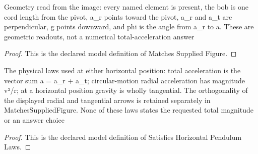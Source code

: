 \begin{definition}
  \label{def:physics:phyx-mini-0692:phyxminiproblems-problemphyxmini0692-matchessuppliedfigure}
  Geometry read from the image: every named element is present, the bob is one cord length from the pivot, a\_r points toward the pivot, a\_r and a\_t are perpendicular, g points downward, and phi is the angle from a\_r to a. These are geometric readouts, not a numerical total-acceleration answer
\end{definition}
\begin{proof}
  This is the declared model definition of Matches Supplied Figure.
\end{proof}
\begin{definition}
  \label{def:physics:phyx-mini-0692:phyxminiproblems-problemphyxmini0692-satisfieshorizontalpendulumlaws}
  The physical laws used at either horizontal position: total acceleration is the vector sum a = a\_r + a\_t; circular-motion radial acceleration has magnitude v²/r; at a horizontal position gravity is wholly tangential. The orthogonality of the displayed radial and tangential arrows is retained separately in MatchesSuppliedFigure. None of these laws states the requested total magnitude or an answer choice
\end{definition}
\begin{proof}
  This is the declared model definition of Satisfies Horizontal Pendulum Laws.
\end{proof}
